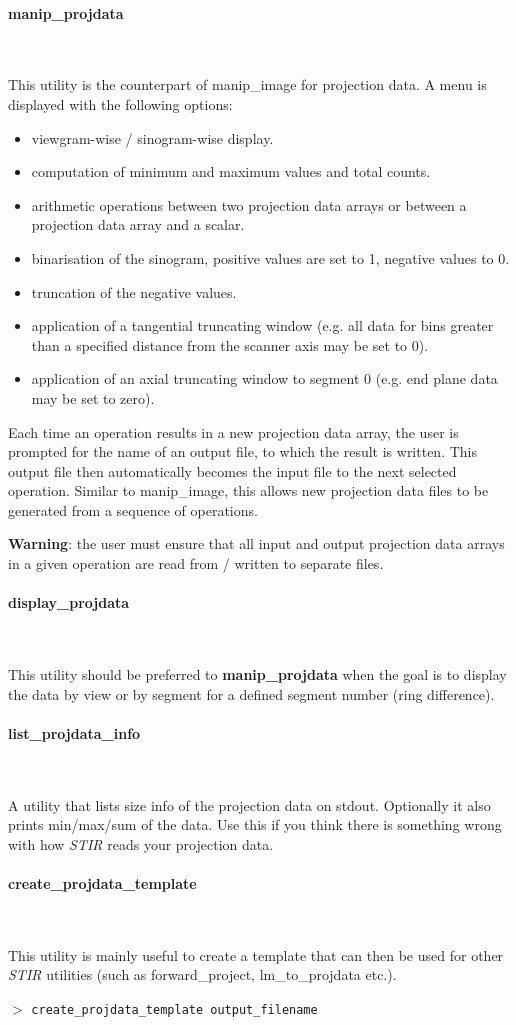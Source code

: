 \documentclass{article}
\newcommand{\subsubsubsection}[1]{\paragraph{#1}\mbox{} \\}
\newcommand{\cmdline}[1]{\par \noindent $>$ \texttt{#1}\par}
\begin{document}
{ \subsubsubsection{manip\_projdata}
}

This utility is the counterpart of manip\_image for projection 
data. A menu is displayed with the following options:

\begin{itemize}
\item viewgram-wise / sinogram-wise display.
\item computation of minimum and maximum values and total counts.
\item arithmetic operations between two projection data arrays or 
between a projection data array and a scalar.
\item binarisation of the sinogram, positive values are set to 1, 
negative values to 0.
\item truncation of the negative values.
\item application of a tangential truncating window (e.g. all data 
for bins greater than a specified distance from the scanner axis 
may be set to 0).
\item application of an axial truncating window to segment 0 (e.g. 
end plane data may be set to zero).
\end{itemize}
Each time an operation results in a new projection data array, 
the user is prompted for the name of an output file, to which 
the result is written. This output file then automatically becomes 
the input file to the next selected operation. Similar to manip\_image, 
this allows new projection data files to be generated from a 
sequence of operations.


\textbf{Warning}: the user must ensure that all input and output projection 
data arrays in a given operation are read from / written to separate 
files.

{ \subsubsubsection{display\_projdata}
}

This utility should be preferred to \textbf{manip\_projdata} when the 
goal is to display the data by view or by segment for a defined 
segment number (ring difference).

{ \subsubsubsection{list\_projdata\_info}
}

A utility that lists size info of the projection data on stdout. Optionally
it also prints min/max/sum of the data. 
Use this if you think there is something wrong with how \textit{STIR} 
reads your projection data.

{ \subsubsubsection{create\_projdata\_template}
}

This utility is mainly useful to create a template that can then 
be used for other \textit{STIR} utilities (such as forward\_project, lm\_to\_projdata 
etc.).
\cmdline{create\_projdata\_template output\_filename}
\end{document}
